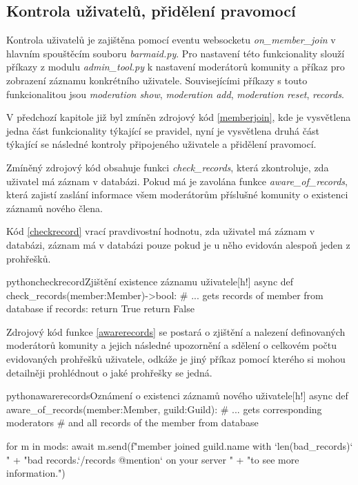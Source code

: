 \documentclass[
  program=inf,
biblatex=false,
sourcecodes=true,
joinlists=true,
  figures=true,
  tables=true,
  glossaries=true,
  index=false
]{kidiplom}
\begin{document}
\newpage
\subsection{Kontrola uživatelů, přidělení pravomocí}
Kontrola uživatelů je zajištěna pomocí eventu websocketu {\it on\_member\_join} 
v hlavním spouštěcím souboru {\it barmaid.py}. Pro nastavení této funkcionality slouží příkazy
z modulu {\it admin\_tool.py} k nastavení moderátorů komunity a příkaz pro zobrazení záznamu 
konkrétního uživatele. Souvisejícími příkazy s touto funkcionalitou jsou {\it moderation show}, 
{\it moderation add}, {\it moderation reset}, {\it records}.

V předchozí kapitole již byl zmíněn zdrojový kód \ref{memberjoin}, kde je 
vysvětlena jedna část funkcionality týkající se pravidel, nyní je vysvětlena druhá část týkající se
následné kontroly připojeného uživatele a přidělení pravomocí.

Zmíněný zdrojový kód obsahuje funkci {\it check\_records}, která zkontroluje, zda uživatel má
záznam v databázi. Pokud má je zavolána funkce {\it aware\_of\_records}, která zajistí zaslání
informace všem moderátorům příslušné komunity o existenci záznamů nového člena.

Kód \ref{checkrecord} vrací pravdivostní hodnotu, zda uživatel má záznam v databázi, 
záznam má v databázi pouze pokud je u něho evidován alespoň jeden z prohřešků.

\begin{kicode}{python}{checkrecord}{Zjištění existence záznamu uživatele}[h!]
  async def check_records(member:Member)->bool:
    # ... gets records of member from database
    if records:
        return True
    return False
\end{kicode}

Zdrojový kód funkce \ref{awarerecords} se postará o zjištění a nalezení definovaných moderátorů komunity
a jejich následné upozornění a sdělení o celkovém počtu evidovaných prohřešků uživatele, odkáže je jiný příkaz
pomocí kterého si mohou detailněji prohlédnout o jaké prohřešky se jedná.

\begin{kicode}{python}{awarerecords}{Oznámení o existenci záznamů nového uživatele}[h!]
  async def aware_of_records(member:Member, guild:Guild):
    # ... gets corresponding moderators
    # and all records of the member from database
    
    for m in mods:
        await m.send(f"{member} joined {guild.name} with `{len(bad_records)}` " +
              "bad records.\nUse `/records @mention` on your server " +
              "to see more information.")
\end{kicode}
\end{document}
